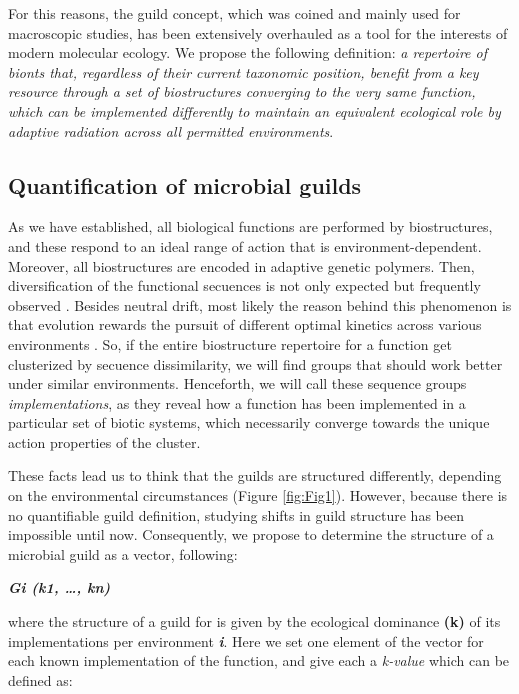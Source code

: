 \documentclass[Journal,letterpaper,NoLists]{ascelike-new}
\begin{document}
For this reasons, the guild concept, which was coined and mainly used for macroscopic studies, has been extensively overhauled as a tool for the interests of modern molecular ecology. We propose the following definition: \textit{a repertoire of bionts that, regardless of their current taxonomic position, benefit from a key resource through a set of biostructures converging to the very same function, which can be implemented differently to maintain an equivalent ecological role by adaptive radiation across all permitted environments}.

\subsection{Quantification of microbial guilds}

As we have established, all biological functions are performed by biostructures, and these respond to an ideal range of action that is environment-dependent. Moreover, all biostructures are encoded in adaptive genetic polymers. Then, diversification of the functional secuences is not only expected but frequently observed \cite{pascual2010quantifying,soria2014functional}.  Besides neutral drift, most likely the reason behind this phenomenon is that evolution rewards the pursuit of different optimal kinetics across various environments \cite{alam2009studies,offre2014variability}. So, if the entire biostructure repertoire for a function get clusterized by secuence dissimilarity, we will find groups that should work better under similar environments. Henceforth, we will call these sequence groups \textit{implementations}, as they reveal how a function has been implemented in a particular set of biotic systems, which necessarily converge towards the unique action properties of the cluster.

These facts lead us to think that the guilds are structured differently, depending on the environmental circumstances (Figure \ref{fig:Fig1}). However, because there is no quantifiable guild definition, studying shifts in guild structure has been impossible until now. Consequently, we propose to determine the structure of a microbial guild as a vector, following:

\textbf{\textit{Gi (k1, …, kn)}}

where the structure of a guild for is given by the ecological dominance \textbf{(k)} of its implementations per environment \textbf{\textit{i}}. Here  we set one element of the vector for each known implementation of the function,  and give each a \textit{k-value} which can be defined as:
\end{document}
